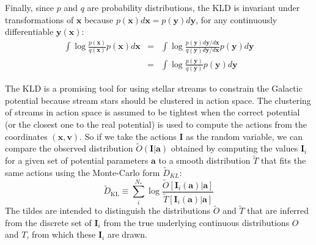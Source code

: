 \documentclass{emulateapj}
\newcommand{\sub}[2]{\ensuremath{#1_{\mathrm{#2}}}}
\begin{document}
Finally, since $p$ and $q$ are probability distributions, the KLD is invariant under transformations of $\mathbf{x}$ because $p(\mathbf{x}) d\mathbf{x} = p(\mathbf{y}) d\mathbf{y}$, for any continuously differentiable $\mathbf{y}(\mathbf{x})$:
\begin{eqnarray}
  \int  \log \frac{p(\mathbf{x})}{q(\mathbf{x})} p(\mathbf{x}) d\mathbf{x} &=& \int \log \frac{p(\mathbf{y}) d\mathbf{y}/d\mathbf{x}}{q(\mathbf{y})d\mathbf{y}/d\mathbf{x}} p(\mathbf{y}) d\mathbf{y} \nonumber \\
  &=&  \int  \log \frac{p(\mathbf{y})}{q(\mathbf{y})} p(\mathbf{y}) d\mathbf{y} 
\end{eqnarray}


The KLD is a promising tool for using stellar streams to constrain the Galactic potential because stream stars should be clustered in action space. The clustering of streams in action space is assumed to be tightest when the correct potential (or the closest one to the real potential) is used to compute the actions from the coordinates $(\mathbf{x},\mathbf{v})$. So if we take the actions $\mathbf{I}$ as the random variable, we can compare the observed distribution $\tilde{O}(\mathbf{I}|\mathbf{a})$ obtained by computing the values $\mathbf{I}_i$ for a given set of potential parameters $\mathbf{a}$ to a smooth distribution $\tilde{T}$ that fits the same actions using the Monte-Carlo form $\tilde{D}_{KL}$:
\begin{equation}
\label{eq:KLD_perfect}
\sub{\tilde{D}}{KL} \equiv \sum_i^{N_*} \log \frac{\tilde{O}[\mathbf{I}_i(\mathbf{a})|\mathbf{a}]}{\tilde{T}[\mathbf{I}_i(\mathbf{a})|\mathbf{a}]}
\end{equation}
The tildes are intended to distinguish the distributions $\tilde{O}$ and $\tilde{T}$ that are inferred from the discrete set of $\mathbf{I}_i$ from the true underlying continuous distributions $O$ and $T$, from which these $\mathbf{I}_i$ are drawn.
\end{document}
